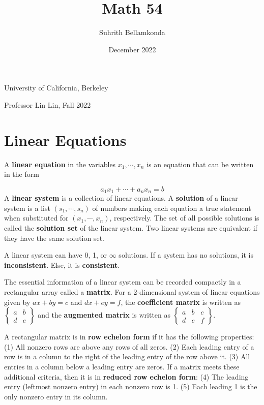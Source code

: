 \documentclass{article}
\title{\textbf{Math 54}}
\author{Suhrith Bellamkonda}
\date{December 2022}
\begin{document}
\maketitle{}
\begin{center}
    University of California, Berkeley
\end{center}
\begin{center}
    Professor Lin Lin, Fall 2022
\end{center}

\section{Linear Equations}

A \textbf{linear equation} in the variables $x_1,\cdots,x_n$ is an equation that can be written in the form

\begin{equation}
a_1x_1+\cdots+a_nx_n = b 
\end{equation}
\hfill \newline
A \textbf{linear system} is a collection of linear equations. A \textbf{solution} of a linear system is a list $(s_1,\cdots,s_n)$ of numbers making each equation a true statement when substituted for $(x_1,\cdots,x_n)$, respectively. The set of all possible solutions is called the \textbf{solution set} of the linear system. Two linear systems are equivalent if they have the same solution set.

\hfill \newline
A linear system can have 0, 1, or $\infty$ solutions. If a system has no solutions, it is \textbf{inconsistent}. Else, it is \textbf{consistent}.

\hfill \newline The essential information of a linear system can be recorded compactly in a rectangular array called a \textbf{matrix}. For a 2-dimensional system of linear equations given by $ax+by=c$ and $dx+ey=f$, the \textbf{coefficient matrix} is written as 
$\begin{Bmatrix}
a & b\\
d & e
\end{Bmatrix}$
and the \textbf{augmented matrix} is written as
$\begin{Bmatrix}
a & b & c\\
d & e & f
\end{Bmatrix}.$

\hfill \newline
A rectangular matrix is in \textbf{row echelon form} if it has the following properties: (1) All nonzero rows are above any rows of all zeros. (2) Each leading entry of a row is in a column to the right of the leading entry of the row above it. (3) All entries in a column below a leading entry are zeros. If a matrix meets these additional criteria, then it is in \textbf{reduced row echelon form}: (4) The leading entry (leftmost nonzero entry) in each nonzero row is 1. (5) Each leading 1 is the only nonzero entry in its column. 
\end{document}
